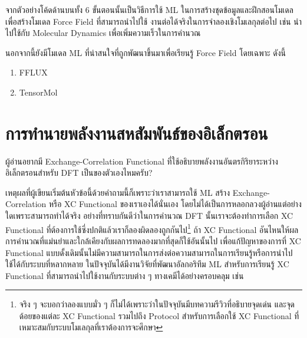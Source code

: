 \vspace{1em}

จากตัวอย่างโค้ดด้านบนทั้ง 6 ขั้นตอนนั้นเป็นวิธีการใช้ ML ในการสร้างชุดข้อมูลและฝึกสอนโมเดลเพื่อสร้างโมเดล Force Field ที่สามารถนำไปใช้%
งานต่อได้จริงในการจำลองเชิงโมเลกุลต่อไป เช่น นำไปใช้กับ Molecular Dynamics เพื่อเพิ่มความเร็วในการคำนวณ

นอกจากนี้ยังมีโมเดล ML ที่น่าสนใจที่ถูกพัฒนาขึ้นมาเพื่อเรียนรู้ Force Field โดยเฉพาะ ดังนี้

\begin{enumerate}[topsep=0pt]
    \item FFLUX\autocite{hughes2019}
    
    \item TensorMol\autocite{yao2018}
\end{enumerate}

\section{การทำนายพลังงานสหสัมพันธ์ของอิเล็กตรอน}
\label{sec:pred_corre_ener}

\begin{framed}
    ผู้อ่านอยากมี Exchange-Correlation Functional ที่ใช้อธิบายพลังงานอันตรกิริยาระหว่างอิเล็กตรอนสำหรับ DFT เป็นของตัวเองไหมครับ? 
\end{framed}

เหตุผลที่ผู้เขียนเริ่มต้นหัวข้อนี้ด้วยคำถามนี้ก็เพราะว่าเราสามารถใช้ ML สร้าง Exchange-Correlation หรือ XC Functional ของเราเองได้นั่นเอง 
โดยไม่ได้เป็นการหลอกลวงผู้อ่านแต่อย่างใดเพราะสามารถทำได้จริง อย่างที่ทราบกันดีว่าในการคำนวณ DFT นั้นเราจะต้องทำการเลือก XC Functional 
ที่ต้องการใช้ซึ่งปกติแล้วเราก็ลองผิดลองถูกกันไป\footnote{จริง ๆ จะบอกว่าลองแบบมั่ว ๆ ก็ไม่ได้เพราะว่าในปัจจุบันมีบทความรีวิวที่อธิบายจุดเด่น%
และจุดด้อยของแต่ละ XC Functional รวมไปถึง Protocol สำหรับการเลือกใช้ XC Functional ที่เหมาะสมกับระบบโมเลกุลที่เราต้องการจะศึกษา} 
ถ้า XC Functional อันไหนให้ผลการคำนวณที่แม่นยำและใกล้เคียงกับผลการทดลองมากที่สุดก็ใช้อันนั้นไป เพื่อแก้ปัญหาของการที่ XC Functional 
แบบดั้งเดิมนั้นไม่มีความสามารถในการส่งต่อความสามารถในการเรียนรู้หรือการนำไปใช้ได้กับระบบที่หลากหลาย ในปัจจุบันได้มีงานวิจัยที่พัฒนาอัลกอริทึม 
ML สำหรับการเรียนรู้ XC Functional ที่สามารถนำไปใช้งานกับระบบต่าง ๆ ทางเคมีได้อย่างครอบคลุม เช่น 

